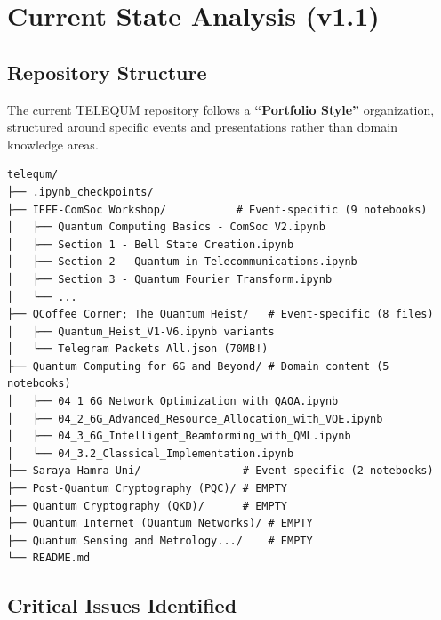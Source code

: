\documentclass[11pt,a4paper]{article}
\begin{document}
\section{Current State Analysis (v1.1)}

\subsection{Repository Structure}

The current TELEQUM repository follows a \textbf{``Portfolio Style''} organization, structured around specific events and presentations rather than domain knowledge areas.

\begin{lstlisting}[caption={Current v1.1 Directory Structure}]
telequm/
├── .ipynb_checkpoints/
├── IEEE-ComSoc Workshop/           # Event-specific (9 notebooks)
│   ├── Quantum Computing Basics - ComSoc V2.ipynb
│   ├── Section 1 - Bell State Creation.ipynb
│   ├── Section 2 - Quantum in Telecommunications.ipynb
│   ├── Section 3 - Quantum Fourier Transform.ipynb
│   └── ...
├── QCoffee Corner; The Quantum Heist/   # Event-specific (8 files)
│   ├── Quantum_Heist_V1-V6.ipynb variants
│   └── Telegram Packets All.json (70MB!)
├── Quantum Computing for 6G and Beyond/ # Domain content (5 notebooks)
│   ├── 04_1_6G_Network_Optimization_with_QAOA.ipynb
│   ├── 04_2_6G_Advanced_Resource_Allocation_with_VQE.ipynb
│   ├── 04_3_6G_Intelligent_Beamforming_with_QML.ipynb
│   └── 04_3.2_Classical_Implementation.ipynb
├── Saraya Hamra Uni/                # Event-specific (2 notebooks)
├── Post-Quantum Cryptography (PQC)/ # EMPTY
├── Quantum Cryptography (QKD)/      # EMPTY
├── Quantum Internet (Quantum Networks)/ # EMPTY
├── Quantum Sensing and Metrology.../    # EMPTY
└── README.md
\end{lstlisting}

\subsection{Critical Issues Identified}
\end{document}
